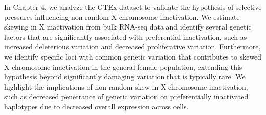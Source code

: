 In Chapter 4, we analyze the GTEx dataset \cite{GTEx_Consortium2020-xx} to validate the hypothesis of selective pressures influencing non-random X chromosome inactivation. We estimate skewing in X inactivation from bulk RNA-seq data and identify several genetic factors that are significantly associated with preferential inactivation, such as increased deleterious variation and decreased proliferative variation. Furthermore, we identify specific loci with common genetic variation that contributes to skewed X chromosome inactivation in the general female population, extending this hypothesis beyond significantly damaging variation that is typically rare. We highlight the implications of non-random skew in X chromosome inactivation, such as decreased penetrance of genetic variation on preferentially inactivated haplotypes due to decreased overall expression across cells.